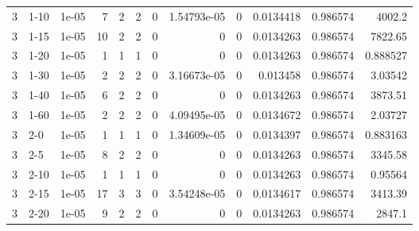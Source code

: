 \begin{tabular}{rlrrrrrrrrrr}
     3 & 1-10   &      1e-05 &           7 &                 2 &                 2 &        0        &     1.54793e-05 &         0        &        0.0134418 &               0.986574 &        4002.2      \\
     3 & 1-15   &      1e-05 &          10 &                 2 &                 2 &        0        &     0           &         0        &        0.0134263 &               0.986574 &        7822.65     \\
     3 & 1-20   &      1e-05 &           1 &                 1 &                 1 &        0        &     0           &         0        &        0.0134263 &               0.986574 &           0.888527 \\
     3 & 1-30   &      1e-05 &           2 &                 2 &                 2 &        0        &     3.16673e-05 &         0        &        0.013458  &               0.986574 &           3.03542  \\
     3 & 1-40   &      1e-05 &           6 &                 2 &                 2 &        0        &     0           &         0        &        0.0134263 &               0.986574 &        3873.51     \\
     3 & 1-60   &      1e-05 &           2 &                 2 &                 2 &        0        &     4.09495e-05 &         0        &        0.0134672 &               0.986574 &           2.03727  \\
     3 & 2-0    &      1e-05 &           1 &                 1 &                 1 &        0        &     1.34609e-05 &         0        &        0.0134397 &               0.986574 &           0.883163 \\
     3 & 2-5    &      1e-05 &           8 &                 2 &                 2 &        0        &     0           &         0        &        0.0134263 &               0.986574 &        3345.58     \\
     3 & 2-10   &      1e-05 &           1 &                 1 &                 1 &        0        &     0           &         0        &        0.0134263 &               0.986574 &           0.95564  \\
     3 & 2-15   &      1e-05 &          17 &                 3 &                 3 &        0        &     3.54248e-05 &         0        &        0.0134617 &               0.986574 &        3413.39     \\
     3 & 2-20   &      1e-05 &           9 &                 2 &                 2 &        0        &     0           &         0        &        0.0134263 &               0.986574 &        2847.1      \\

\end{tabular}
